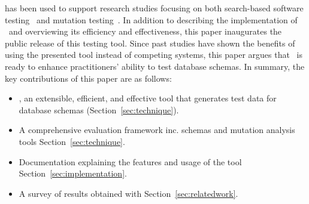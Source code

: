 {\sa} has been used to support research studies focusing on both search-based software
testing~\cite{kapfhammer2013search,mcminn2015effectiveness,kinneer2015automatically} and mutation
testing~\cite{wright2013efficient,wright2014impact,wright2015mutation,mcminn2016virtual}.  In addition to describing the
implementation of \sa~and overviewing its efficiency and effectiveness, this paper inaugurates the public release of
this testing tool. Since past studies have shown the benefits of using the presented tool instead of competing systems,
this paper argues that \sa~is ready to enhance practitioners' ability to test database schemas.  In summary, the key
contributions of this paper are as follows:


\begin{itemize}


  \item {\sa}, an extensible, efficient, and effective tool that generates test data for database schemas
    (Section~\ref{sec:technique}).


  \item A comprehensive evaluation framework inc. schemas and mutation analysis tools Section~\ref{sec:technique}.


  \item Documentation explaining the features and usage of the tool Section~\ref{sec:implementation}.


  \item A survey of results obtained with {\sa} Section~\ref{sec:relatedwork}.

\end{itemize}
